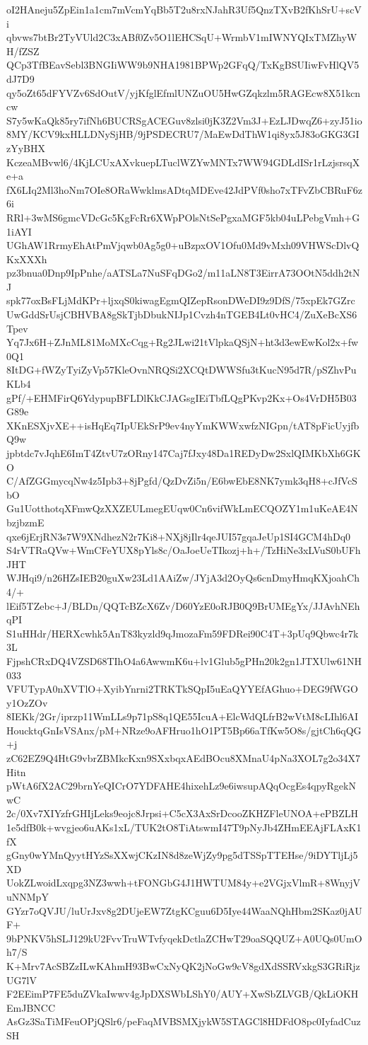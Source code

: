 oI2HAneju5ZpEin1a1cm7mVcmYqBb5T2u8rxNJahR3Uf5QnzTXvB2fKhSrU+scVi
qbvws7btBr2TyVUld2C3xABf0Zv5O1lEHCSqU+WrmbV1mIWNYQIxTMZhyWH/fZSZ
QCp3TfBEavSebl3BNGIiWW9b9NHA1981BPWp2GFqQ/TxKgBSUIiwFvHlQV5dJ7D9
qy5oZt65dFYVZv6SdOutV/yjKfglEfmlUNZuOU5HwGZqkzlm5RAGEcw8X51kcncw
S7y5wKaQk85ry7ifNh6BUCRSgACEGuv8zlsi0jK3Z2Vm3J+EzLJDwqZ6+zyJ51io
8MY/KCV9kxHLLDNySjHB/9jPSDECRU7/MaEwDdThW1qi8yx5J83oGKG3GIzYyBHX
KczeaMBvwl6/4KjLCUxAXvkuepLTuclWZYwMNTx7WW94GDLdISr1rLzjsrsqXe+a
fX6LIq2Ml3hoNm7OIe8ORaWwklmsADtqMDEve42JdPVf0sho7xTFvZbCBRuF6z6i
RRl+3wMS6gmcVDcGc5KgFcRr6XWpPOlsNtSePgxaMGF5kb04uLPebgVmh+G1iAYI
UGhAW1RrmyEhAtPmVjqwb0Ag5g0+uBzpxOV1Ofu0Md9vMxh09VHWScDlvQKxXXXh
pz3bnua0Dnp9IpPnhe/aATSLa7NuSFqDGo2/m11aLN8T3EirrA73OOtN5ddh2tNJ
spk77oxBsFLjMdKPr+ljxqS0kiwagEgmQIZepRsonDWeDI9z9DfS/75xpEk7GZrc
UwGddSrUsjCBHVBA8gSkTjbDbukNIJp1Cvzh4nTGEB4Lt0vHC4/ZuXeBcXS6Tpev
Yq7Jx6H+ZJnML81MoMXcCqg+Rg2JLwi21tVlpkaQSjN+ht3d3ewEwKol2x+fw0Q1
8ItDG+fWZyTyiZyVp57KleOvnNRQSi2XCQtDWWSfu3tKucN95d7R/pSZhvPuKLb4
gPf/+EHMFirQ6YdypupBFLDlKkCJAGsgIEiTbfLQgPKvp2Kx+Os4VrDH5B03G89e
XKnESXjvXE++isHqEq7IpUEkSrP9ev4nyYmKWWxwfzNIGpn/tAT8pFicUyjfbQ9w
jpbtdc7vJqhE6ImT4ZtvU7zORny147Caj7fJxy48Da1REDyDw2SxlQIMKbXh6GKO
C/AfZGGmycqNw4z5Ipb3+8jPgfd/QzDvZi5n/E6bwEbE8NK7ymk3qH8+cJfVcSbO
Gu1UotthotqXFmwQzXXZEULmegEUqw0Cn6vifWkLmECQOZY1m1uKeAE4NbzjbzmE
qxe6jErjRN3s7W9XNdhezN2r7Ki8+NXj8jIlr4qeJUI57gqaJeUp1SI4GCM4hDq0
S4rVTRaQVw+WmCFeYUX8pYls8c/OaJoeUeTIkozj+h+/TzHiNe3xLVuS0bUFhJHT
WJHqi9/n26HZsIEB20guXw23Ld1AAiZw/JYjA3d2OyQs6cnDmyHmqKXjoahCh4/+
lEif5TZebc+J/BLDn/QQTcBZcX6Zv/D60YzE0oRJB0Q9BrUMEgYx/JJAvhNEhqPI
S1uHHdr/HERXcwhk5AnT83kyzld9qJmozaFm59FDRei90C4T+3pUq9Qbwc4r7k3L
FjpshCRxDQ4VZSD68TIhO4a6AwwmK6u+lv1Glub5gPHn20k2gn1JTXUlw61NH033
VFUTypA0nXVTlO+XyibYnrni2TRKTkSQpI5uEaQYYEfAGhuo+DEG9fWGOy1OzZOv
8IEKk/2Gr/iprzp11WmLLs9p71pS8q1QE55IcuA+ElcWdQLfrB2wVtM8cLIhl6AI
HoucktqGnIsVSAnx/pM+NRze9oAFHruo1hO1PT5Bp66aTfKw5O8s/gjtCh6qQG+j
zC62EZ9Q4HtG9vbrZBMkcKxn9SXxbqxAEdBOcu8XMnaU4pNa3XOL7g2o34X7Hitn
pWtA6fX2AC29brnYeQICrO7YDFAHE4hixehLz9e6iwsupAQqOcgEs4qpyRgekNwC
2c/0Xv7XIYzfrGHIjLeks9eojc8Jrpsi+C5cX3AxSrDcooZKHZFleUNOA+ePBZLH
1e5dfB0k+wvgjeo6uAKs1xL/TUK2tO8TiAtswmI47T9pNyJb4ZHmEEAjFLAxK1fX
gGny0wYMnQyytHYzSsXXwjCKzIN8d8zeWjZy9pg5dTSSpTTEHse/9iDYTljLj5XD
UokZLwoidLxqpg3NZ3wwh+tFONGbG4J1HWTUM84y+e2VGjxVlmR+8WnyjVuNNMpY
GYzr7oQVJU/luUrJxv8g2DUjeEW7ZtgKCguu6D5Iye44WaaNQhHbm2SKaz0jAUF+
9bPNKV5hSLJ129kU2FvvTruWTvfyqekDctlaZCHwT29oaSQQUZ+A0UQs0UmOh7/S
K+Mrv7AcSBZzILwKAhmH93BwCxNyQK2jNoGw9cV8gdXdSSRVxkgS3GRiRjzUG7lV
F2EEimP7FE5duZVkaIwwv4gJpDXSWbLShY0/AUY+XwSbZLVGB/QkLiOKHEmJBNCC
AsGz3SaTiMFeuOPjQSlr6/peFaqMVBSMXjykW5STAGCl8HDFdO8pc0IyfadCuzSH
